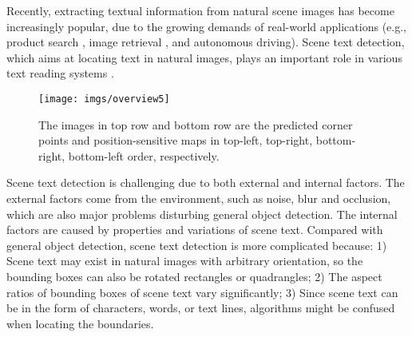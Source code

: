 \documentclass[10pt,twocolumn,letterpaper]{article}
\begin{document}
Recently, extracting textual information from natural scene images has become increasingly popular, due to the growing   demands of real-world applications (e.g., product search \cite{bai2017integrating}, image retrieval \cite{jaderberg2016reading}, and autonomous driving). Scene text detection, which aims at locating text in natural images, plays an important role in various text reading systems \cite{neumann2010method, epshtein2010detecting, wang2011end, bissacco2013photoocr, jaderberg2014deep,gomez2017textproposals, Busta_2017_ICCV, Li_2017_ICCV}.

\begin{figure}
\vspace{-2mm}

\begin{centering}
\texttt{[image: imgs/overview5]}
\par\end{centering}
\caption{The images in top row and bottom row are the predicted corner points and position-sensitive maps in top-left, top-right, bottom-right, bottom-left order, respectively.}
\label{img_overview}
\vspace{-5mm}
\end{figure}

Scene text detection is challenging due to both external and internal factors. The external factors come from the environment, such as noise, blur and occlusion, which are also major problems disturbing general object detection. The internal factors are caused by properties and variations of scene text. Compared with general object detection, scene text detection is more complicated because: 1) Scene text may exist in natural images with arbitrary orientation, so the bounding boxes can also be rotated rectangles or quadrangles; 2) The aspect ratios of bounding boxes of scene text vary significantly; 3) Since scene text can be in the form of characters, words, or text lines, algorithms might be confused when locating the boundaries. 
\end{document}
